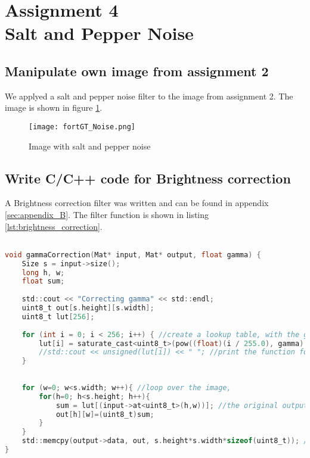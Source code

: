 \section {Assignment 4 \\ {Salt and Pepper Noise}}
\label {sec:assignment_4}

\subsection{Manipulate own image from assignment 2}

We applyed a salt and pepper noise filter to the image from assignment 2. The image is shown in figure \ref{fig:fortGT_Noise}.

\begin{figure}[h!]
    \centering
    \texttt{[image: fortGT\_Noise.png]}
    \caption{Image with salt and pepper noise}
    \label{fig:fortGT_Noise}
\end{figure}

\subsection{Write C/C++ code for Brightness correction}

A Brightness correction filter was written and can be found in appendix \ref{sec:appendix_B}. The filter function is shown in listing \ref{lst:brightness_correction}.

\begin{lstlisting}[language=C, caption={Brightness correction}, label=lst:brightness_correction]

void gammaCorrection(Mat* input, Mat* output, float gamma) {
    Size s = input->size();
    long h, w;
    float sum;
    
    std::cout << "Correcting gamma" << std::endl;
    uint8_t out[s.height][s.width];
    uint8_t lut[256];	
    
    for (int i = 0; i < 256; i++) { //create a lookup table, with the gamma correction curve.
        lut[i] = saturate_cast<uint8_t>(pow((float)(i / 255.0), gamma) * 255.0f); //saturate cast negative values to 0, and higher values to 255 (uint8_t or unsigned char)
        //std::cout << unsigned(lut[i]) << " "; //print the function for testing. cout prints uint8_t as chars so we cast it.
    }
    
    
    for (w=0; w<s.width; w++){ //loop over the image, 
        for(h=0; h<s.height; h++){
            sum = lut[(input->at<uint8_t>(h,w))]; //the original output value will be scaled to the value in the LUT.
            out[h][w]=(uint8_t)sum;
        }
    }
    std::memcpy(output->data, out, s.height*s.width*sizeof(uint8_t)); //copy our standard 2D array to a new buffer that OpenCV understands
}

\end{lstlisting}


